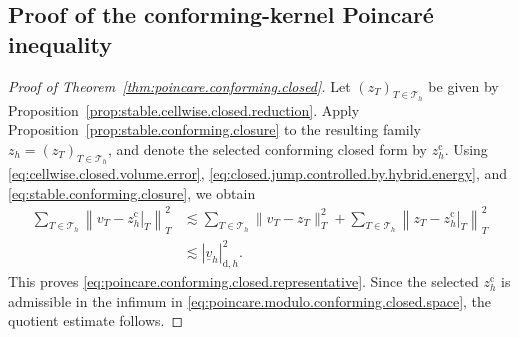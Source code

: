 \documentclass[a4paper,11pt]{article}
\theoremstyle{definition}
\newcommand{\DIFF}{\mathrm{d}}
\begin{document}
\subsection{Proof of the conforming-kernel Poincar\'e inequality}
\label{subsec:proof.poincare.conforming.closed}

\begin{proof}[Proof of Theorem~\ref{thm:poincare.conforming.closed}]

Let $(z_T)_{T\in\mathcal T_h}$ be given by Proposition~\ref{prop:stable.cellwise.closed.reduction}.
Apply Proposition~\ref{prop:stable.conforming.closure} to the resulting family $z_h=(z_T)_{T\in\mathcal T_h}$, and denote the selected conforming closed form by $z_h^{\mathrm c}$.
Using \eqref{eq:cellwise.closed.volume.error}, \eqref{eq:closed.jump.controlled.by.hybrid.energy}, and \eqref{eq:stable.conforming.closure}, we obtain
\[
\begin{aligned}
  \sum_{T\in\mathcal T_h}
  \left\|
    v_T-\left.z_h^{\mathrm c}\right|_T
  \right\|_T^2
  &\lesssim
  \sum_{T\in\mathcal T_h}
  \|v_T-z_T\|_T^2
  +
  \sum_{T\in\mathcal T_h}
  \left\|
    z_T-\left.z_h^{\mathrm c}\right|_T
  \right\|_T^2
  \\
  &\lesssim
  |\underline v_h|_{\DIFF,h}^2.
\end{aligned}
\]
This proves \eqref{eq:poincare.conforming.closed.representative}.
Since the selected $z_h^{\mathrm c}$ is admissible in the infimum in \eqref{eq:poincare.modulo.conforming.closed.space}, the quotient estimate follows.
\end{proof}
\end{document}
